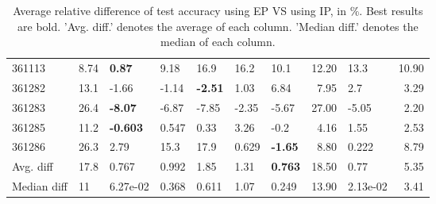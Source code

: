 \begin{table}[ht!]
\begin{tabular}{lllllllrlr}
  361113 & 8.74 & \textbf{0.87} & 9.18 & 16.9 & 16.2 & 10.1 & 12.20 & 13.3 & 10.90 \\ 
  361282 & 13.1 & -1.66 & -1.14 & \textbf{-2.51} & 1.03 & 6.84 & 7.95 & 2.7 & 3.29 \\ 
  361283 & 26.4 & \textbf{-8.07} & -6.87 & -7.85 & -2.35 & -5.67 & 27.00 & -5.05 & 2.20 \\ 
  361285 & 11.2 & \textbf{-0.603} & 0.547 & 0.33 & 3.26 & -0.2 & 4.16 & 1.55 & 2.53 \\ 
  361286 & 26.3 & 2.79 & 15.3 & 17.9 & 0.629 & \textbf{-1.65} & 8.80 & 0.222 & 8.79 \\ 
   \hline
Avg. diff & 17.8 & 0.767 & 0.992 & 1.85 & 1.31 & \textbf{0.763} & 18.50 & 0.77 & 5.35 \\ 
  Median diff & 11 &  6.27e-02 & 0.368 & 0.611 & 1.07 & 0.249 & 13.90 &  2.13e-02 & 3.41 \\ 
   \hline
\hline
\end{tabular}
\endgroup
\caption{Average relative difference of test accuracy using EP VS using IP, in \%. 
                  Best results are bold. 
                  'Avg. diff.' denotes the average of each column.
                  'Median diff.' denotes the median of each column.} 
\label{TABLES/table_results_accuracy_only_num_features_EP_VS_IP}
\end{table}
